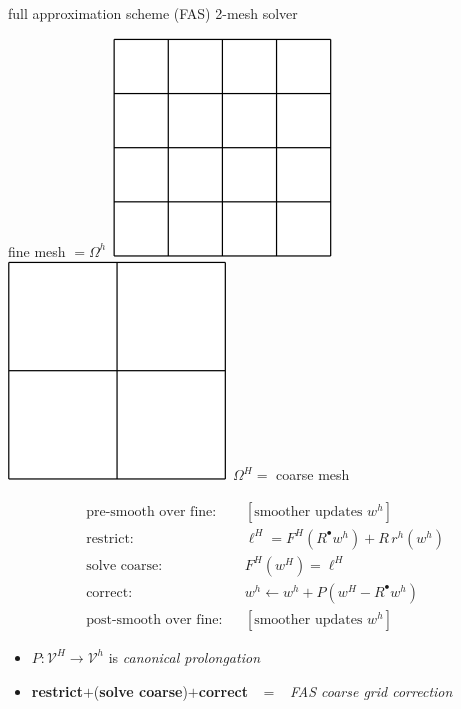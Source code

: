 \documentclass[svgnames,
               hyperref={colorlinks,citecolor=DeepPink4,linkcolor=FireBrick,urlcolor=Maroon},
               usepdftitle=false]  %
               {beamer}
\newcommand{\iR}{R^{\bullet}}
\begin{document}
\begin{frame}{full approximation scheme (FAS) 2-mesh solver}

\begin{center}
fine mesh $=\Omega^h$\, \includegraphics[height=0.14\textheight]{../talk-oxford/images/fine-grid.png} \hspace{15mm} \includegraphics[height=0.14\textheight]{../talk-oxford/images/coarse-grid.png} \,$\Omega^H=$ coarse mesh
\end{center}

\begin{align*}
&\text{pre-smooth over fine:} & & [\text{smoother updates } w^h] \\
&\text{restrict:}                   & &\ell^H = F^H(\iR w^h) + R\, r^h(w^h) \\
&\text{solve coarse:}                      & &F^H(w^H) = \ell^H \\
&\text{correct:}                    & &w^h \leftarrow w^h + P(w^H - \iR w^h) \\
&\text{post-smooth over fine:} & & [\text{smoother updates } w^h]
\end{align*}

\bigskip
{\small
\begin{itemize}
\item $P: \mathcal{V}^H \to \mathcal{V}^h$ is \emph{canonical prolongation}
\item \textbf{restrict}$+$(\textbf{solve coarse})$+$\textbf{correct} \, $=$ \, \emph{FAS coarse grid correction}
\end{itemize}
}
\end{frame}
\end{document}
